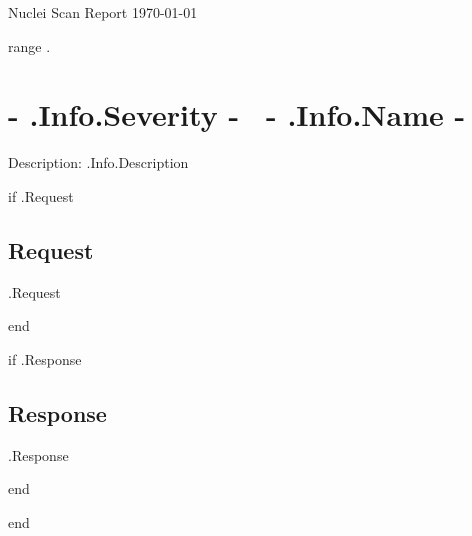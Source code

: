 \documentclass{article}
\begin{document}

\begin{titlepage}
\begin{center}
{\huge Nuclei Scan Report}
\vfill
\large{\today}

\end{center}
\end{titlepage}


{{range .}}

	\section{ \colorbox{ {{- .Info.Severity -}} }{ {{- .Info.Severity -}} }~{{- .Info.Name -}} }

	Description: {{ .Info.Description }}

	{{if .Request}}

	\subsection{Request}

    \begin{Highlighting}
{{.Request}} 
    \end{Highlighting}
	{{end}}

	{{if .Response}}
    \subsection{Response}
    \begin{Highlighting}
{{.Response}}
    \end{Highlighting}
	{{end}}
 
{{end}}

\end{document}
